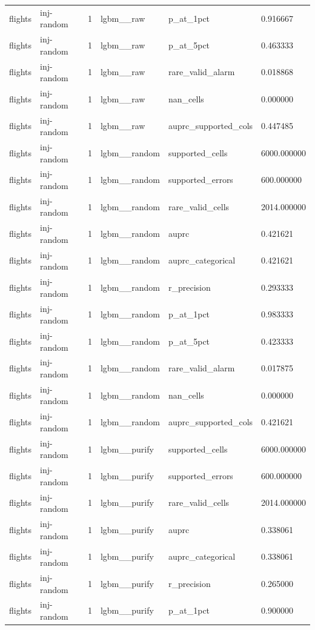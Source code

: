 \begin{tabular}{llllll}
flights & inj-random & 1 & lgbm\_\_raw & p\_at\_1pct & 0.916667 \\
flights & inj-random & 1 & lgbm\_\_raw & p\_at\_5pct & 0.463333 \\
flights & inj-random & 1 & lgbm\_\_raw & rare\_valid\_alarm & 0.018868 \\
flights & inj-random & 1 & lgbm\_\_raw & nan\_cells & 0.000000 \\
flights & inj-random & 1 & lgbm\_\_raw & auprc\_supported\_cols & 0.447485 \\
flights & inj-random & 1 & lgbm\_\_random & supported\_cells & 6000.000000 \\
flights & inj-random & 1 & lgbm\_\_random & supported\_errors & 600.000000 \\
flights & inj-random & 1 & lgbm\_\_random & rare\_valid\_cells & 2014.000000 \\
flights & inj-random & 1 & lgbm\_\_random & auprc & 0.421621 \\
flights & inj-random & 1 & lgbm\_\_random & auprc\_categorical & 0.421621 \\
flights & inj-random & 1 & lgbm\_\_random & r\_precision & 0.293333 \\
flights & inj-random & 1 & lgbm\_\_random & p\_at\_1pct & 0.983333 \\
flights & inj-random & 1 & lgbm\_\_random & p\_at\_5pct & 0.423333 \\
flights & inj-random & 1 & lgbm\_\_random & rare\_valid\_alarm & 0.017875 \\
flights & inj-random & 1 & lgbm\_\_random & nan\_cells & 0.000000 \\
flights & inj-random & 1 & lgbm\_\_random & auprc\_supported\_cols & 0.421621 \\
flights & inj-random & 1 & lgbm\_\_purify & supported\_cells & 6000.000000 \\
flights & inj-random & 1 & lgbm\_\_purify & supported\_errors & 600.000000 \\
flights & inj-random & 1 & lgbm\_\_purify & rare\_valid\_cells & 2014.000000 \\
flights & inj-random & 1 & lgbm\_\_purify & auprc & 0.338061 \\
flights & inj-random & 1 & lgbm\_\_purify & auprc\_categorical & 0.338061 \\
flights & inj-random & 1 & lgbm\_\_purify & r\_precision & 0.265000 \\
flights & inj-random & 1 & lgbm\_\_purify & p\_at\_1pct & 0.900000 \\

\end{tabular}
